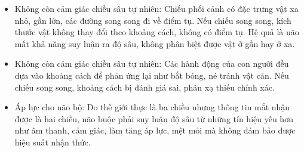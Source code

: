 \begin{itemize}
	\item Không còn cảm giác chiều sâu tự nhiên: Chiếu phối cảnh có đặc trưng vật xa nhỏ, gần lớn, các đường song song đi về điểm tụ. Nếu chiếu song song, kích thước vật không thay đổi theo khoảng cách, không có điểm tụ. Hệ quả là não mất khả năng suy luận ra độ sâu, không phân biệt được vật ở gần hay ở xa.
	
	\item Không còn cảm giác chiều sâu tự nhiên: Các hành động của con người đều dựa vào khoảng cách để phản ứng lại như bắt bóng, né tránh vật cản. Nếu chiếu song song, khoảng cách bị đánh giá sai, phản xạ thiếu chính xác.
	
	\item Áp lực cho não bộ: Do thế giới thực là ba chiều nhưng thông tin mắt nhận được là hai chiều, não buộc phải suy luận độ sâu từ những tín hiệu yếu hơn như âm thanh, cảm giác, làm tăng áp lực, mệt mỏi mà không đảm bảo được hiệu suất nhận thức.
\end{itemize}





































































